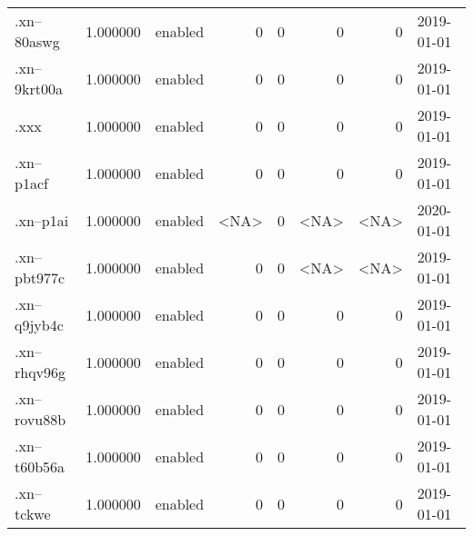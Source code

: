 \begin{tabular}{lrlrrrrl}
.xn--80aswg               &          1.000000 &         enabled &                           0 &                           0 &                           0 &                   0 &           2019-01-01 \\
.xn--9krt00a              &          1.000000 &         enabled &                           0 &                           0 &                           0 &                   0 &           2019-01-01 \\
.xxx                      &          1.000000 &         enabled &                           0 &                           0 &                           0 &                   0 &           2019-01-01 \\
.xn--p1acf                &          1.000000 &         enabled &                           0 &                           0 &                           0 &                   0 &           2019-01-01 \\
.xn--p1ai                 &          1.000000 &         enabled &                        <NA> &                           0 &                        <NA> &                <NA> &           2020-01-01 \\
.xn--pbt977c              &          1.000000 &         enabled &                           0 &                           0 &                        <NA> &                <NA> &           2019-01-01 \\
.xn--q9jyb4c              &          1.000000 &         enabled &                           0 &                           0 &                           0 &                   0 &           2019-01-01 \\
.xn--rhqv96g              &          1.000000 &         enabled &                           0 &                           0 &                           0 &                   0 &           2019-01-01 \\
.xn--rovu88b              &          1.000000 &         enabled &                           0 &                           0 &                           0 &                   0 &           2019-01-01 \\
.xn--t60b56a              &          1.000000 &         enabled &                           0 &                           0 &                           0 &                   0 &           2019-01-01 \\
.xn--tckwe                &          1.000000 &         enabled &                           0 &                           0 &                           0 &                   0 &           2019-01-01 \\

\end{tabular}
